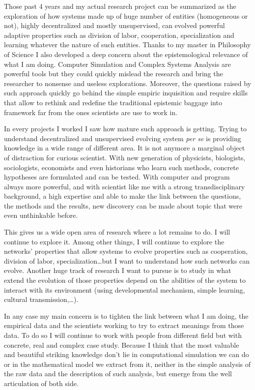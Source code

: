 \documentclass[10pt]{article}
\begin{document}
 Those past 4 years and my actual research project can be summarized as the exploration of how systems made up of huge number of entities (homogeneous or not), highly decentralized and mostly unsupervised, can evolved powerful adaptive properties such as division of labor, cooperation, specialization and learning whatever the nature of such entities. Thanks to my master in Philosophy of Science I also developed a deep concern about the epistemological relevance of what I am doing. Computer Simulation and Complex Systems Analysis are powerful tools but they could quickly mislead the research and bring the researcher to nonsense and useless explorations. Moreover, the questions raised by such approach quickly go behind the simple empiric inquisition and require skills that allow to rethink and redefine the traditional epistemic baggage into framework far from the ones scientists are use to work in.


In every projects I worked I saw how mature such approach is getting. Trying to understand decentralized and unsupervised evolving system \emph{per se} is providing knowledge in a wide range of different area. It is not anymore a marginal object of distraction for curious scientist. With new generation of physicists, biologists, sociologists, economists and even historians who learn such methods, concrete hypotheses are formulated and can be tested. With computer and program always more powerful, and with scientist like me with a strong transdisciplinary background, a high expertise and able to make the link between the questions, the methods and the results, new discovery can be made about topic that were even unthinkable before. 

This gives us a wide open area of research where a lot remains to do.  I will continue to explore it. Among other things, I will continue to explore the networks' properties that allow systems to evolve properties such as cooperation, division of labor, specialization\ldots but I want to understand how such networks can evolve. Another huge track of research I want to pursue is to study in what extend the evolution of those properties depend on the abilities of the system to interact with its environment (using developmental mechanism, simple learning, cultural transmission,\ldots). 

In any case my main concern is to tighten the link between what I am doing, the empirical data and the scientists working to try to extract meanings from those data. To do so I will continue to work with people from different field but with concrete, real and complex case study. Because I think that the most valuable and beautiful striking knowledge don't lie in computational simulation we can do or in the mathematical model we extract from it, neither in the simple analysis of the raw data and the description of such analysis, but emerge from the well articulation of both side.




                   
\end{document}
